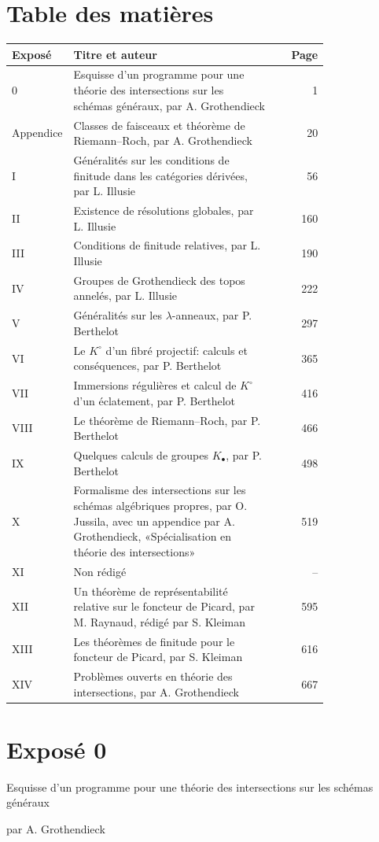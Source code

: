 \documentclass[11pt]{article}
\begin{document}
\section*{Table des matières}
\begin{longtable}{@{}p{0.16\linewidth}p{0.64\linewidth}r@{}}
\toprule
Exposé & Titre et auteur & Page \\
\midrule
0 & Esquisse d'un programme pour une théorie des intersections sur les schémas généraux, par A. Grothendieck & 1 \\
Appendice & Classes de faisceaux et théorème de Riemann--Roch, par A. Grothendieck & 20 \\
I & Généralités sur les conditions de finitude dans les catégories dérivées, par L. Illusie & 56 \\
II & Existence de résolutions globales, par L. Illusie & 160 \\
III & Conditions de finitude relatives, par L. Illusie & 190 \\
IV & Groupes de Grothendieck des topos annelés, par L. Illusie & 222 \\
V & Généralités sur les $\lambda$-anneaux, par P. Berthelot & 297 \\
VI & Le $K^\circ$ d'un fibré projectif: calculs et conséquences, par P. Berthelot & 365 \\
VII & Immersions régulières et calcul de $K^\circ$ d'un éclatement, par P. Berthelot & 416 \\
VIII & Le théorème de Riemann--Roch, par P. Berthelot & 466 \\
IX & Quelques calculs de groupes $K_\bullet$, par P. Berthelot & 498 \\
X & Formalisme des intersections sur les schémas algébriques propres, par O. Jussila, avec un appendice par A. Grothendieck, «Spécialisation en théorie des intersections» & 519 \\
XI & Non rédigé & -- \\
XII & Un théorème de représentabilité relative sur le foncteur de Picard, par M. Raynaud, rédigé par S. Kleiman & 595 \\
XIII & Les théorèmes de finitude pour le foncteur de Picard, par S. Kleiman & 616 \\
XIV & Problèmes ouverts en théorie des intersections, par A. Grothendieck & 667 \\
\bottomrule
\end{longtable}

\section*{Exposé 0}
\begin{center}
{\large Esquisse d'un programme pour une théorie des intersections sur les schémas généraux}\par
par A. Grothendieck
\end{center}
\end{document}
